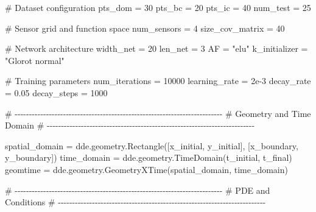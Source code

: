 \documentclass[
  spanish,
  us-letterpaper,
  DIV=11,
  numbers=noendperiod]{scrreprt}
\newenvironment{Shaded}{\begin{snugshade}}{\end{snugshade}}
\newcommand{\CommentTok}[1]{\textcolor[rgb]{0.37,0.37,0.37}{#1}}
\newcommand{\DecValTok}[1]{\textcolor[rgb]{0.68,0.00,0.00}{#1}}
\newcommand{\FloatTok}[1]{\textcolor[rgb]{0.68,0.00,0.00}{#1}}
\newcommand{\NormalTok}[1]{\textcolor[rgb]{0.00,0.23,0.31}{#1}}
\newcommand{\OperatorTok}[1]{\textcolor[rgb]{0.37,0.37,0.37}{#1}}
\newcommand{\StringTok}[1]{\textcolor[rgb]{0.13,0.47,0.30}{#1}}
\theoremstyle{plain}
\theoremstyle{definition}
\theoremstyle{remark}
\begin{document}
\begin{Shaded}
\begin{Highlighting}[]
\CommentTok{\# Dataset configuration}
\NormalTok{pts\_dom }\OperatorTok{=} \DecValTok{30}
\NormalTok{pts\_bc }\OperatorTok{=} \DecValTok{20}
\NormalTok{pts\_ic }\OperatorTok{=} \DecValTok{40}
\NormalTok{num\_test }\OperatorTok{=} \DecValTok{25}

\CommentTok{\# Sensor grid and function space}
\NormalTok{num\_sensors }\OperatorTok{=} \DecValTok{4}
\NormalTok{size\_cov\_matrix }\OperatorTok{=} \DecValTok{40}

\CommentTok{\# Network architecture}
\NormalTok{width\_net }\OperatorTok{=} \DecValTok{20}
\NormalTok{len\_net }\OperatorTok{=} \DecValTok{3}
\NormalTok{AF }\OperatorTok{=} \StringTok{"elu"}
\NormalTok{k\_initializer }\OperatorTok{=} \StringTok{"Glorot normal"}

\CommentTok{\# Training parameters}
\NormalTok{num\_iterations }\OperatorTok{=} \DecValTok{10000}
\NormalTok{learning\_rate }\OperatorTok{=} \FloatTok{2e{-}3}
\NormalTok{decay\_rate }\OperatorTok{=} \FloatTok{0.05}
\NormalTok{decay\_steps }\OperatorTok{=} \DecValTok{1000}

\CommentTok{\# {-}{-}{-}{-}{-}{-}{-}{-}{-}{-}{-}{-}{-}{-}{-}{-}{-}{-}{-}{-}{-}{-}{-}{-}{-}{-}{-}{-}{-}{-}{-}{-}{-}{-}{-}{-}{-}{-}{-}{-}{-}{-}{-}{-}{-}{-}{-}{-}{-}{-}{-}{-}{-}{-}{-}{-}{-}{-}{-}{-}{-}{-}{-}{-}{-}{-}{-}{-}{-}{-}{-}{-}{-}}
\CommentTok{\# Geometry and Time Domain}
\CommentTok{\# {-}{-}{-}{-}{-}{-}{-}{-}{-}{-}{-}{-}{-}{-}{-}{-}{-}{-}{-}{-}{-}{-}{-}{-}{-}{-}{-}{-}{-}{-}{-}{-}{-}{-}{-}{-}{-}{-}{-}{-}{-}{-}{-}{-}{-}{-}{-}{-}{-}{-}{-}{-}{-}{-}{-}{-}{-}{-}{-}{-}{-}{-}{-}{-}{-}{-}{-}{-}{-}{-}{-}{-}{-}}

\NormalTok{spatial\_domain }\OperatorTok{=}\NormalTok{ dde.geometry.Rectangle([x\_initial, y\_initial],}
\NormalTok{                                        [x\_boundary, y\_boundary])}
\NormalTok{time\_domain }\OperatorTok{=}\NormalTok{ dde.geometry.TimeDomain(t\_initial, t\_final)}
\NormalTok{geomtime }\OperatorTok{=}\NormalTok{ dde.geometry.GeometryXTime(spatial\_domain, time\_domain)}

\CommentTok{\# {-}{-}{-}{-}{-}{-}{-}{-}{-}{-}{-}{-}{-}{-}{-}{-}{-}{-}{-}{-}{-}{-}{-}{-}{-}{-}{-}{-}{-}{-}{-}{-}{-}{-}{-}{-}{-}{-}{-}{-}{-}{-}{-}{-}{-}{-}{-}{-}{-}{-}{-}{-}{-}{-}{-}{-}{-}{-}{-}{-}{-}{-}{-}{-}{-}{-}{-}{-}{-}{-}{-}{-}{-}}
\CommentTok{\# PDE and Conditions}
\CommentTok{\# {-}{-}{-}{-}{-}{-}{-}{-}{-}{-}{-}{-}{-}{-}{-}{-}{-}{-}{-}{-}{-}{-}{-}{-}{-}{-}{-}{-}{-}{-}{-}{-}{-}{-}{-}{-}{-}{-}{-}{-}{-}{-}{-}{-}{-}{-}{-}{-}{-}{-}{-}{-}{-}{-}{-}{-}{-}{-}{-}{-}{-}{-}{-}{-}{-}{-}{-}{-}{-}{-}{-}{-}{-}}


\end{Highlighting}
\end{Shaded}
\end{document}

